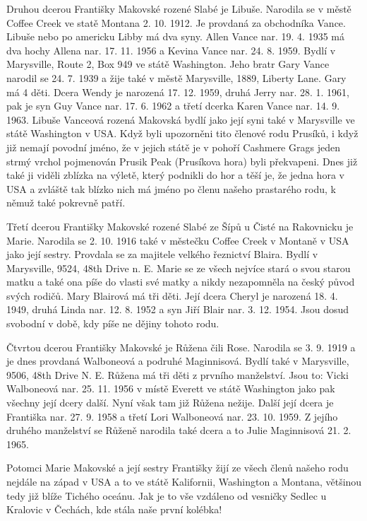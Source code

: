 \documentclass[../dejiny-rodu-prusiku.tex]{subfiles}
\begin{document}
Druhou dcerou Františky Makovské rozené Slabé je Libuše. Narodila se v městě Coffee Creek ve statě Montana 2. 10. 1912. Je provdaná za obchodníka Vance. Libuše nebo po americku Libby má dva syny. Allen Vance nar. 19. 4. 1935 má dva hochy Allena nar. 17. 11. 1956 a Kevina Vance nar. 24. 8. 1959. Bydlí v Marysville, Route 2, Box 949 ve státě Washing­ton. Jeho bratr Gary Vance narodil se 24. 7. 1939 a žije také v městě Marysville, 1889, Liberty Lane. Gary má 4 děti. Dcera Wendy je narozená 17. 12. 1959, druhá Jerry nar. 28. 1. 1961, pak je syn Guy Vance nar. 17. 6. 1962 a třetí dcerka
Karen Vance nar. 14. 9. 1963. Libuše Vanceová rozená Makovská bydlí jako její syni také v Marysville ve státě Washington v USA.
Když byli upozorněni tito členové rodu Prusíků, i když již nemají povodní jméno, že v jejich státě je v pohoří Cashmere Grags jeden strmý vrchol pojmenován Prusik Peak (Prusíkova hora) byli překvapeni. Dnes již také ji viděli zblízka na výletě, který podnikli do hor a těší je, že jedna hora v USA a zvláště tak blízko nich má jméno po členu našeho prastarého rodu, k němuž také pokrevně patří.

Třetí dcerou Františky Makovské rozené Slabé ze Šípů u Čisté na Rakovnicku je Marie. Narodila se 2. 10. 1916 také v městečku Coffee Creek v Montaně v USA jako její sestry. Provdala se za majitele velkého řeznictví Blaira. Bydlí v Marysville, 9524, 48th Drive n. E. Marie se ze všech nejvíce stará o svou starou matku a také ona píše do vlasti své matky a nikdy nezapomněla na český původ svých rodičů. Mary Blairová má tři děti. Její dcera Cheryl je narozená 18. 4. 1949, druhá Linda nar. 12. 8. 1952 a syn Jiří Blair nar. 3. 12. 1954. Jsou dosud svobodní v době, kdy píše ne dějiny tohoto rodu.

Čtvrtou dcerou Františky Makovské je Růžena čili Rose. Narodila se 3. 9. 1919 a je dnes provdaná Walboneová a podruhé Maginnisová. Bydlí také v Marysville, 9506, 48th Drive N. E. Růžena má tři děti z prvního manželství. Jsou to: Vicki Walboneová nar. 25. 11. 1956 v místě Everett ve státě Washington jako pak všechny její dcery další. Nyní však tam již Růžena nežije. Další její dcera je Františka nar. 27. 9. 1958 a třetí Lori Walboneová nar. 23. 10. 1959. Z jejího druhého manželství se Růženě narodila také dcera a to Julie Maginnisová 21. 2. 1965.

Potomci Marie Makovské a její sestry Františky žijí ze všech členů našeho rodu nejdále na západ v USA a to ve státě Kalifornii, Washington a Montana, většinou tedy již blíže Tichého oceánu. Jak je to vše vzdáleno od vesničky Sedlec u Kralovic v Čechách, kde stála naše první ko­lébka!
\end{document}
